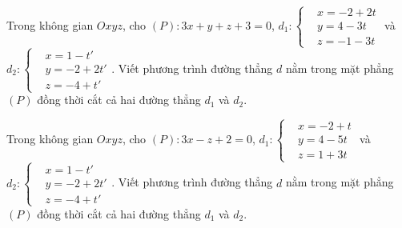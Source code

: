 \begin{bt}%
	Trong không gian $Oxyz$, cho $(P):3x+y+z+3=0$, $d_1:\left\{\begin{aligned}&x=-2+2t\\&y=4-3t\\&z=-1-3t\end{aligned}\right.$ và $d_2:\left\{\begin{aligned}&x=1-t'\\&y=-2+2t'\\&z=-4+t'\end{aligned}\right.$. Viết phương trình đường thẳng $d$ nằm trong mặt phẳng $(P)$ đồng thời cắt cả hai đường thẳng $d_1$ và $d_2$.
\end{bt}
\begin{bt}%
	Trong không gian $Oxyz$, cho $(P):3x-z+2=0$, $d_1:\left\{\begin{aligned}&x=-2+t\\&y=4-5t\\&z=1+3t\end{aligned}\right.$ và $d_2:\left\{\begin{aligned}&x=1-t'\\&y=-2+2t'\\&z=-4+t'\end{aligned}\right.$. Viết phương trình đường thẳng $d$ nằm trong mặt phẳng $(P)$ đồng thời cắt cả hai đường thẳng $d_1$ và $d_2$.
\end{bt}

